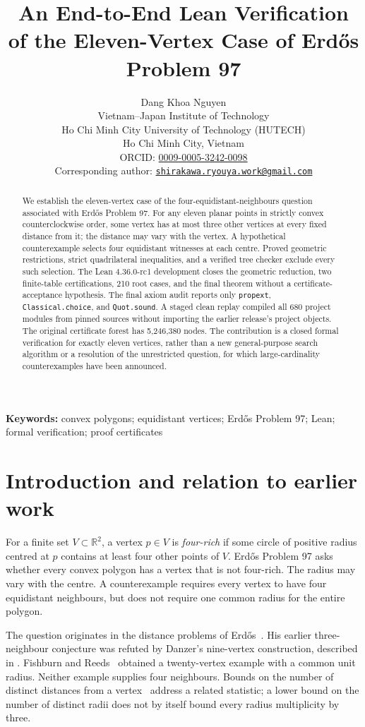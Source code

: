 \documentclass[11pt,a4paper]{article}
\title{An End-to-End Lean Verification of the Eleven-Vertex Case of Erd\H{o}s Problem 97}
\author{Dang Khoa Nguyen\\[2pt]
\small Vietnam--Japan Institute of Technology\\
\small Ho Chi Minh City University of Technology (HUTECH)\\
\small Ho Chi Minh City, Vietnam\\[3pt]
\small ORCID: \href{https://orcid.org/0009-0005-3242-0098}{0009-0005-3242-0098}\\[2pt]
\small Corresponding author: \href{mailto:shirakawa.ryouya.work@gmail.com}{\nolinkurl{shirakawa.ryouya.work@gmail.com}}}
\date{}
\theoremstyle{definition}
\newcommand{\R}{\mathbb R}
\newcommand{\code}[1]{\texttt{#1}}
\begin{document}
\maketitle
\begin{abstract}
We establish the eleven-vertex case of the four-equidistant-neighbours question associated with Erd\H{o}s Problem 97. For any eleven planar points in strictly convex counterclockwise order, some vertex has at most three other vertices at every fixed distance from it; the distance may vary with the vertex. A hypothetical counterexample selects four equidistant witnesses at each centre. Proved geometric restrictions, strict quadrilateral inequalities, and a verified tree checker exclude every such selection. The Lean 4.36.0-rc1 development closes the geometric reduction, two finite-table certifications, 210 root cases, and the final theorem without a certificate-acceptance hypothesis. The final axiom audit reports only \code{propext}, \code{Classical.choice}, and \code{Quot.sound}. A staged clean replay compiled all 680 project modules from pinned sources without importing the earlier release's project objects. The original certificate forest has 5,246,380 nodes. The contribution is a closed formal verification for exactly eleven vertices, rather than a new general-purpose search algorithm or a resolution of the unrestricted question, for which large-cardinality counterexamples have been announced.
\end{abstract}
\noindent\textbf{Keywords:} convex polygons; equidistant vertices; Erd\H{o}s Problem 97; Lean; formal verification; proof certificates
\section{Introduction and relation to earlier work}\label{sec:intro}
For a finite set $V\subset\R^2$, a vertex $p\in V$ is \emph{four-rich} if some circle of positive radius centred at $p$ contains at least four other points of $V$. Erd\H{o}s Problem 97 asks whether every convex polygon has a vertex that is not four-rich. The radius may vary with the centre. A counterexample requires every vertex to have four equidistant neighbours, but does not require one common radius for the entire polygon.

The question originates in the distance problems of Erd\H{o}s~\cite{Erdos1946,Erdos1987}. His earlier three-neighbour conjecture was refuted by Danzer's nine-vertex construction, described in \cite{Erdos1987}. Fishburn and Reeds~\cite{FishburnReeds1992} obtained a twenty-vertex example with a common unit radius. Neither example supplies four neighbours. Bounds on the number of distinct distances from a vertex~\cite{Dumitrescu2006,Nivasch2013} address a related statistic; a lower bound on the number of distinct radii does not by itself bound every radius multiplicity by three.
\end{document}

